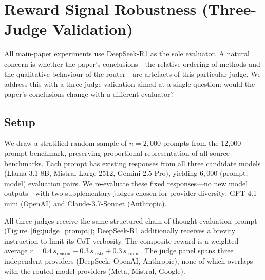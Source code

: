 
\section{Reward Signal Robustness (Three-Judge Validation)}
\label{sec:judge_robustness}

All main-paper experiments use DeepSeek-R1 as the sole evaluator.
A natural concern is whether the paper's conclusions---the relative
ordering of methods and the qualitative behaviour of the router---are
artefacts of this particular judge.  We address this with a
three-judge validation aimed at a single question: would the paper's
conclusions change with a different evaluator?

\subsection{Setup}

We draw a stratified random sample of $n = 2{,}000$ prompts from the
12{,}000-prompt benchmark, preserving proportional representation of
all source benchmarks.  Each prompt has existing responses from all
three candidate models (Llama-3.1-8B, Mistral-Large-2512,
Gemini-2.5-Pro), yielding $6{,}000$ (prompt, model) evaluation pairs.
We re-evaluate these fixed responses---no new model outputs---with two
supplementary judges chosen for provider diversity: GPT-4.1-mini
(OpenAI) and Claude-3.7-Sonnet (Anthropic).

All three judges receive the same structured chain-of-thought
evaluation prompt (Figure~\ref{fig:judge_prompt}); DeepSeek-R1
additionally receives a brevity instruction to limit its CoT
verbosity.  The composite reward is a weighted average
$r = 0.4\,s_{\text{reason}} + 0.3\,s_{\text{instr}} +
0.3\,s_{\text{comm}}$.  The judge panel spans three independent
providers (DeepSeek, OpenAI, Anthropic), none of which overlaps with
the routed model providers (Meta, Mistral, Google).


